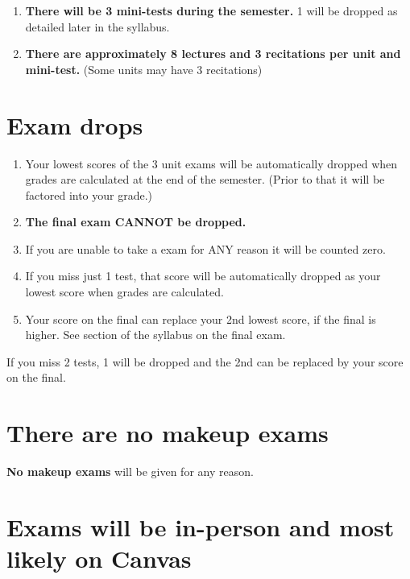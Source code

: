 \documentclass[
]{book}
\providecommand{\tightlist}{%
  \setlength{\itemsep}{0pt}\setlength{\parskip}{0pt}}
\begin{document}
\begin{enumerate}
\def\labelenumi{\arabic{enumi}.}
\tightlist
\item
  \textbf{There will be 3 mini-tests during the semester.} 1 will be dropped as detailed later in the syllabus.
\item
  \textbf{There are approximately 8 lectures and 3 recitations per unit and mini-test.} (Some units may have 3 recitations)
\end{enumerate}

\hypertarget{exam-drops}{%
\section{Exam drops}\label{exam-drops}}

\begin{enumerate}
\def\labelenumi{\arabic{enumi}.}
\tightlist
\item
  Your lowest scores of the 3 unit exams will be automatically dropped when grades are calculated at the end of the semester. (Prior to that it will be factored into your grade.)
\item
  \textbf{The final exam CANNOT be dropped.}
\item
  If you are unable to take a exam for ANY reason it will be counted zero.
\item
  If you miss just 1 test, that score will be automatically dropped as your lowest score when grades are calculated.
\item
  Your score on the final can replace your 2nd lowest score, if the final is higher. See section of the syllabus on the final exam.
\end{enumerate}

If you miss 2 tests, 1 will be dropped and the 2nd can be replaced by your score on the final.

\hypertarget{there-are-no-makeup-exams}{%
\section{There are no makeup exams}\label{there-are-no-makeup-exams}}

\textbf{No makeup exams} will be given for any reason.

\hypertarget{exams-will-be-in-person-and-most-likely-on-canvas}{%
\section{Exams will be in-person and most likely on Canvas}\label{exams-will-be-in-person-and-most-likely-on-canvas}}
\end{document}
